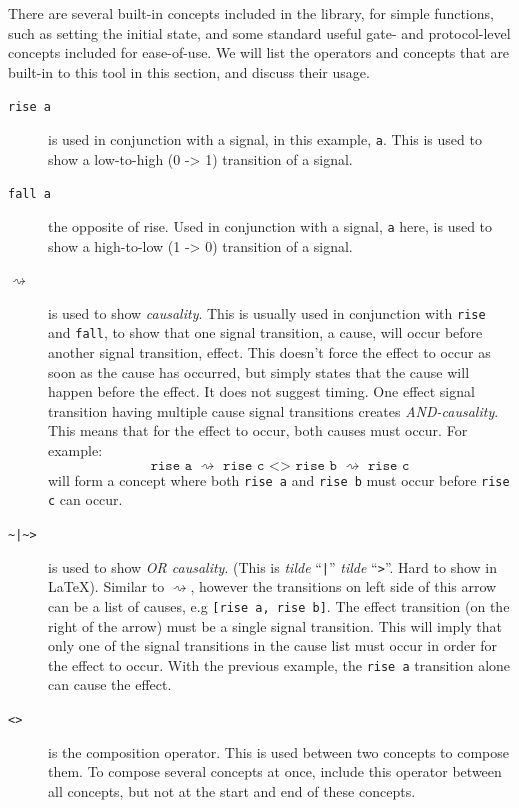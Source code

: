 \documentclass{proc}
\begin{document}
There are several built-in concepts included in the library, for simple functions, such as setting the initial state, and some standard useful gate- and protocol-level concepts included for 
ease-of-use. We will list the operators and concepts that are built-in to this tool in this section, and discuss their usage. 

\begin{description}
  \item [\texttt{rise a}] is used in conjunction with a signal, in this example, \texttt{a}. This is used to show a low-to-high (0 -> 1) transition of a signal.
  
  \item [\texttt{fall a}] the opposite of rise. Used in conjunction with a signal, \texttt{a} here,  is used to show a high-to-low (1 -> 0) transition of a signal.
  
  \item [$\rightsquigarrow$] is used to show \emph{causality}. This is usually used in conjunction with \texttt{rise} and \texttt{fall}, to show that one signal transition, a cause, will occur 
   before another signal transition, effect. This doesn't force the effect to occur as soon as the cause has occurred, but simply states that the cause will happen before the effect. It does 
   not suggest timing. One effect signal transition having multiple cause signal transitions creates \emph{AND-causality}. This means that for the effect to occur, both causes must occur. 
   For example: 
   \[
   \texttt{rise a $\rightsquigarrow$ rise c <> rise b $\rightsquigarrow$ rise c}
   \]
   will form a concept where both \texttt{rise a} and \texttt{rise b} must occur before \texttt{rise c} can occur.
   
   \item [\texttt{\textasciitilde{}|\textasciitilde{}>}] is used to show \emph{OR causality}. (This is \emph{tilde} ``\texttt{|}'' \emph{tilde} ``\texttt{>}''. Hard to show in LaTeX). Similar to 
   $\rightsquigarrow$, however the transitions on left side of this arrow can be a list of causes, e.g \texttt{[rise a, rise b]}. The effect transition (on the right of the arrow) must be a single 
   signal transition. This will imply that only one of the    signal transitions in the cause list must occur in order for the effect to occur. With the previous example, the \texttt{rise a} transition
    alone can cause the effect. 
   
   \item [\texttt{<>}] is the composition operator. This is used between two concepts to compose them. To compose several concepts at once, include this operator between all concepts, 
   but not at the start and end of these concepts. 
   

\end{description}
\end{document}

